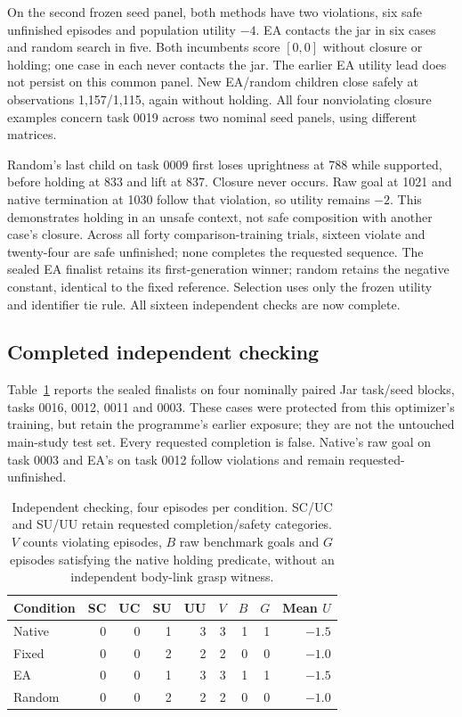 \documentclass[sigconf,dvipsnames,balance=false]{acmart}
\begin{document}
On the second frozen seed panel, both methods have two violations, six safe
unfinished episodes and population utility $-4$. EA contacts the jar in six cases
and random search in five. Both incumbents score $[0,0]$ without closure or holding;
one case in each never contacts the jar. The earlier EA utility lead does not
persist on this common panel. New EA/random children close safely at observations
1,157/1,115, again without holding. All four nonviolating closure examples concern
task 0019 across two nominal seed panels, using different matrices.

Random's last child on task 0009 first loses uprightness at 788 while supported,
before holding at 833 and lift at 837. Closure never occurs. Raw goal at 1021 and native
termination at 1030 follow that violation, so utility remains $-2$. This demonstrates
holding in an unsafe context, not safe composition with another case's closure.
Across all forty comparison-training trials, sixteen violate and twenty-four
are safe unfinished; none completes the requested sequence. The sealed EA
finalist retains its first-generation winner; random retains the negative
constant, identical to the fixed reference. Selection uses only the frozen
utility and identifier tie rule. All sixteen independent checks are now complete.

\subsection{Completed independent checking}
Table~\ref{tab:checking} reports the sealed finalists on four nominally paired
Jar task/seed blocks, tasks 0016, 0012, 0011 and 0003. These cases were protected
from this optimizer's training, but retain the programme's earlier exposure;
they are not the untouched main-study test set. Every requested completion is
false. Native's raw goal on task 0003 and EA's on task 0012 follow violations
and remain requested-unfinished.

\begin{table}[t]
\caption{Independent checking, four episodes per condition. SC/UC and SU/UU
retain requested completion/safety categories. $V$ counts violating episodes,
$B$ raw benchmark goals and $G$ episodes satisfying the native holding predicate,
without an independent body-link grasp witness.}
\label{tab:checking}
\begin{tabular}{lrrrrrrrr}
\toprule
Condition & SC & UC & SU & UU & $V$ & $B$ & $G$ & Mean $U$ \\
\midrule
Native & 0 & 0 & 1 & 3 & 3 & 1 & 1 & $-1.5$ \\
Fixed & 0 & 0 & 2 & 2 & 2 & 0 & 0 & $-1.0$ \\
EA & 0 & 0 & 1 & 3 & 3 & 1 & 1 & $-1.5$ \\
Random & 0 & 0 & 2 & 2 & 2 & 0 & 0 & $-1.0$ \\
\bottomrule
\end{tabular}
\end{table}
\end{document}
